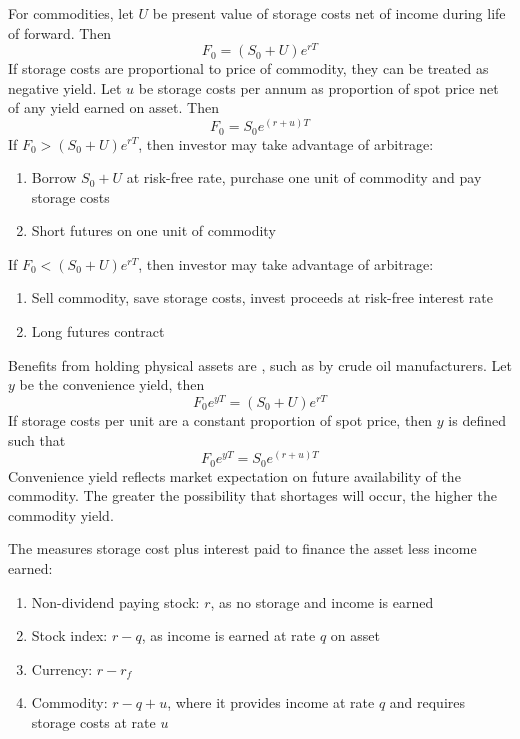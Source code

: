 For commodities, let $U$ be present value of storage costs net of income during life of forward. Then
\begin{equation}
F_0 = (S_0 + U)e^{rT} \nonumber
\end{equation}
If storage costs are proportional to price of commodity, they can be treated as negative yield. Let $u$ be storage costs per annum as proportion of spot price net of any yield earned on asset. Then
\begin{equation}
F_0 = S_0 e^{(r+u)T} \nonumber
\end{equation}
If $F_0 > (S_0 + U)e^{rT}$, then investor may take advantage of arbitrage:
\begin{enumerate}[label=\arabic*.]
\setlength{\itemsep}{0pt}
\item Borrow $S_0 + U$ at risk-free rate, purchase one unit of commodity and pay storage costs
\item Short futures on one unit of commodity
\end{enumerate}
If $F_0 < (S_0 + U)e^{rT}$, then investor may take advantage of arbitrage:
\begin{enumerate}[label=\arabic*.]
\setlength{\itemsep}{0pt}
\item Sell commodity, save storage costs, invest proceeds at risk-free interest rate
\item Long futures contract
\end{enumerate}

Benefits from holding physical assets are , such as by crude oil manufacturers. Let $y$ be the convenience yield, then
\begin{equation}
F_0 e^{yT} = (S_0 + U)e^{rT} \nonumber
\end{equation}
If storage costs per unit are a constant proportion of spot price, then $y$ is defined such that
\begin{equation}
F_0 e^{yT} = S_0 e^{(r+u)T} \nonumber
\end{equation}
Convenience yield reflects market expectation on future availability of the commodity. The greater the possibility that shortages will occur, the higher the commodity yield.

The  measures storage cost plus interest paid to finance the asset less income earned:
\begin{enumerate}[label=\roman*.]
\setlength{\itemsep}{0pt}
\item Non-dividend paying stock: $r$, as no storage and income is earned
\item Stock index: $r-q$, as income is earned at rate $q$ on asset
\item Currency: $r - r_f$
\item Commodity: $r-q+u$, where it provides income at rate $q$ and requires storage costs at rate $u$
\end{enumerate}

